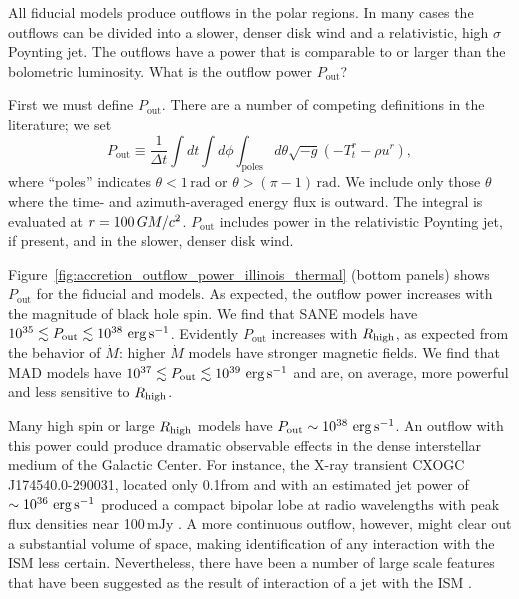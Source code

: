 All fiducial models produce outflows in the polar regions.
In many cases the outflows can be divided into a slower, denser disk wind and a relativistic, high $\sigma$ Poynting jet.
The outflows have a power that is comparable to or larger than the bolometric luminosity.
What is the outflow power $P_\mathrm{out}$?

First we must define $P_\mathrm{out}$.
There are a number of competing definitions in the literature; we set  
\begin{equation}
  P_\mathrm{out} \equiv \frac{1}{\Delta t}\int dt \int d\phi \int_\mathrm{poles} d\theta \sqrt{-g}\left(-T^{r}_{t}-\rho u^{r}\right),
\end{equation}
where ``poles'' indicates $\theta < 1\,\mathrm{rad}$ or $\theta > (\pi-1)\,\mathrm{rad}$.  We include only those $\theta$ where the time- and azimuth-averaged energy flux is outward.
The integral is evaluated at $r = 100\,GM/c^2$.
$P_\mathrm{out}$ includes power in the relativistic Poynting jet, if present, and in the slower, denser disk wind.

Figure~\ref{fig:accretion_outflow_power_illinois_thermal} (bottom panels) shows $P_\mathrm{out}$ for the fiducial \kharma and \bhac models.
As expected, the outflow power increases with the magnitude of black hole spin.
We find that SANE models have $10^{35} \lesssim P_\mathrm{out} \lesssim 10^{38} \,\,\mathrm{erg}\,\mathrm{s}^{-1}$.
Evidently $P_\mathrm{out}$ increases with $R_\mathrm{high}$, as expected from the behavior of $\dot{M}$: higher $\dot{M}$ models have stronger magnetic fields.
We find that MAD models have $10^{37} \lesssim P_\mathrm{out} \lesssim 10^{39}\,\,\mathrm{erg}\,\mathrm{s}^{-1}$ and are, on average, more powerful and less sensitive to $R_\mathrm{high}$.

Many high spin or large $R_\mathrm{high}$ models have $P_\mathrm{out} \sim 10^{38} \,\,\mathrm{erg}\,\mathrm{s}^{-1}$.
An outflow with this power could produce dramatic observable effects in the dense interstellar medium of the Galactic Center.
For instance, the X-ray transient CXOGC J174540.0-290031, located only 0.1\pc from \sgra and with an estimated jet power of $\sim 10^{36}\,\,\mathrm{erg}\,\mathrm{s}^{-1}$ produced a compact bipolar lobe at radio wavelengths with peak flux densities near 100$\,\mathrm{mJy}$ \citep{2005ApJ...633..218B}.
A more continuous  outflow, however, might clear out a substantial volume of space, making identification of any interaction with the ISM less certain.
Nevertheless, there have been a number of large scale features that have been suggested as the result of interaction of a jet with the ISM \citep[e.g.,][]{2013ApJ...779..154L,2021ApJ...922..254C}.

